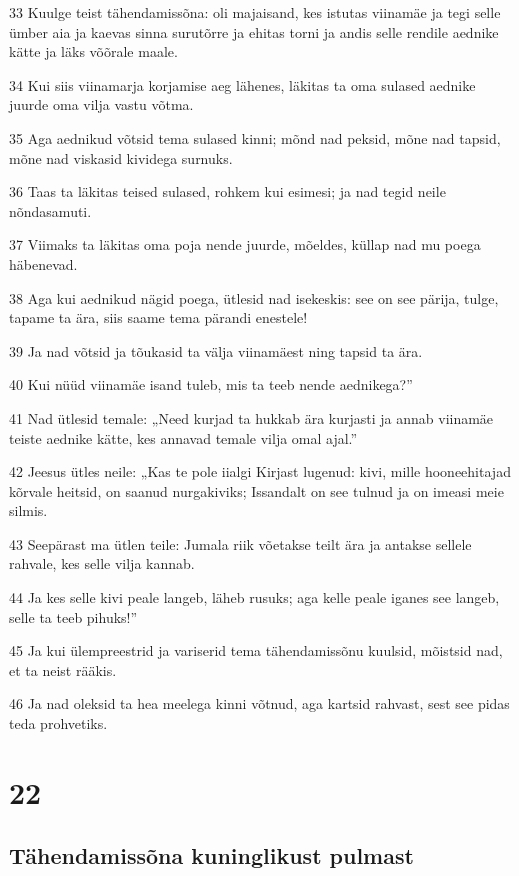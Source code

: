 \par 33 Kuulge teist tähendamissõna: oli majaisand, kes istutas viinamäe ja tegi selle ümber aia ja kaevas sinna surutõrre ja ehitas torni ja andis selle rendile aednike kätte ja läks võõrale maale.
\par 34 Kui siis viinamarja korjamise aeg lähenes, läkitas ta oma sulased aednike juurde oma vilja vastu võtma.
\par 35 Aga aednikud võtsid tema sulased kinni; mõnd nad peksid, mõne nad tapsid, mõne nad viskasid kividega surnuks.
\par 36 Taas ta läkitas teised sulased, rohkem kui esimesi; ja nad tegid neile nõndasamuti.
\par 37 Viimaks ta läkitas oma poja nende juurde, mõeldes, küllap nad mu poega häbenevad.
\par 38 Aga kui aednikud nägid poega, ütlesid nad isekeskis: see on see pärija, tulge, tapame ta ära, siis saame tema pärandi enestele!
\par 39 Ja nad võtsid ja tõukasid ta välja viinamäest ning tapsid ta ära.
\par 40 Kui nüüd viinamäe isand tuleb, mis ta teeb nende aednikega?”
\par 41 Nad ütlesid temale: „Need kurjad ta hukkab ära kurjasti ja annab viinamäe teiste aednike kätte, kes annavad temale vilja omal ajal.”
\par 42 Jeesus ütles neile: „Kas te pole iialgi Kirjast lugenud: kivi, mille hooneehitajad kõrvale heitsid, on saanud nurgakiviks; Issandalt on see tulnud ja on imeasi meie silmis.
\par 43 Seepärast ma ütlen teile: Jumala riik võetakse teilt ära ja antakse sellele rahvale, kes selle vilja kannab.
\par 44 Ja kes selle kivi peale langeb, läheb rusuks; aga kelle peale iganes see langeb, selle ta teeb pihuks!”
\par 45 Ja kui ülempreestrid ja variserid tema tähendamissõnu kuulsid, mõistsid nad, et ta neist rääkis.
\par 46 Ja nad oleksid ta hea meelega kinni võtnud, aga kartsid rahvast, sest see pidas teda prohvetiks.


\chapter{22}

\section*{Tähendamissõna kuninglikust pulmast}

